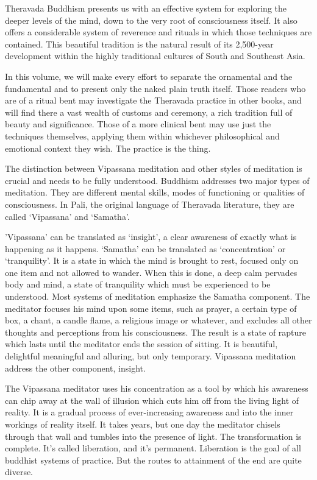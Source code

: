 Theravada Buddhism presents us with an effective system for exploring the deeper
levels of the mind, down to the very root of consciousness itself. It also
offers a considerable system of reverence and rituals in which those techniques
are contained. This beautiful tradition is the natural result of its 2,500-year
development within the highly traditional cultures of South and Southeast Asia.

In this volume, we will make every effort to separate the ornamental and the
fundamental and to present only the naked plain truth itself. Those readers who
are of a ritual bent may investigate the Theravada practice in other books, and
will find there a vast wealth of customs and ceremony, a rich tradition full of
beauty and significance. Those of a more clinical bent may use just the
techniques themselves, applying them within whichever philosophical and
emotional context they wish. The practice is the thing.

The distinction between Vipassana meditation and other styles of meditation is
crucial and needs to be fully understood.  Buddhism addresses two major types of
meditation. They are different mental skills, modes of functioning or qualities
of consciousness. In Pali, the original language of Theravada literature, they
are called `Vipassana' and `Samatha'.

'Vipassana' can be translated as `insight', a clear awareness of exactly what is
happening as it happens. `Samatha' can be translated as `concentration' or
`tranquility'. It is a state in which the mind is brought to rest, focused only
on one item and not allowed to wander. When this is done, a deep calm pervades
body and mind, a state of tranquility which must be experienced to be
understood. Most systems of meditation emphasize the Samatha component. The
meditator focuses his mind upon some items, such as prayer, a certain type of
box, a chant, a candle flame, a religious image or whatever, and excludes all
other thoughts and perceptions from his consciousness. The result is a state of
rapture which lasts until the meditator ends the session of sitting. It is
beautiful, delightful meaningful and alluring, but only temporary. Vipassana
meditation address the other component, insight.

The Vipassana meditator uses his concentration as a tool by which his awareness
can chip away at the wall of illusion which cuts him off from the living light
of reality. It is a gradual process of ever-increasing awareness and into the
inner workings of reality itself. It takes years, but one day the meditator
chisels through that wall and tumbles into the presence of light. The
transformation is complete. It's called liberation, and it's permanent.
Liberation is the goal of all buddhist systems of practice. But the routes to
attainment of the end are quite diverse.

